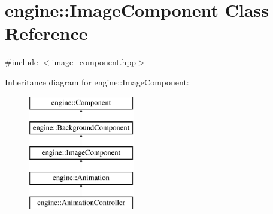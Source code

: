 \hypertarget{classengine_1_1_image_component}{}\section{engine\+:\+:Image\+Component Class Reference}
\label{classengine_1_1_image_component}


{\ttfamily \#include $<$image\+\_\+component.\+hpp$>$}

Inheritance diagram for engine\+:\+:Image\+Component\+:\begin{figure}[H]
\begin{center}
\leavevmode
\includegraphics[height=5.000000cm]{classengine_1_1_image_component}
\end{center}
\end{figure}
